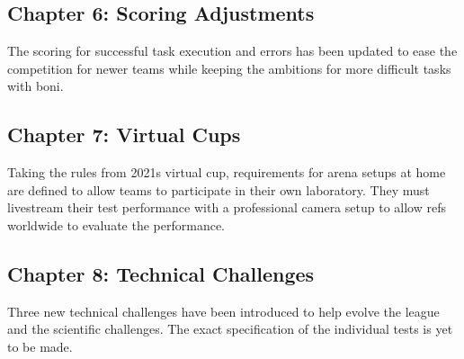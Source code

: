 \subsection{Chapter 6: Scoring Adjustments}

The scoring for successful task execution and errors has been updated to ease the competition for newer teams while keeping the ambitions for more difficult tasks with boni.

\subsection{Chapter 7: Virtual Cups}

Taking the rules from 2021s virtual cup, 
requirements for arena setups at home are defined to allow teams to participate in their own laboratory.
They must livestream their test performance with a professional camera setup to allow refs worldwide to evaluate the performance.

\subsection{Chapter 8: Technical Challenges}

Three new technical challenges have been introduced to help evolve the league and the scientific challenges. 
The exact specification of the individual tests is yet to be made.
	

